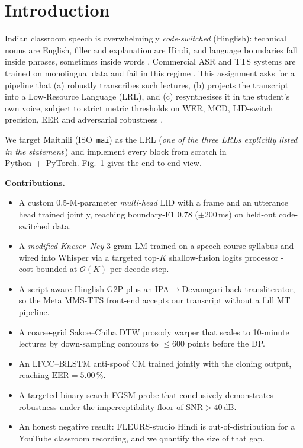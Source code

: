 \documentclass[conference]{IEEEtran}
\begin{document}
\section{Introduction}
Indian classroom speech is overwhelmingly \textit{code-switched}
(Hinglish): technical nouns are English, filler and explanation are
Hindi, and language boundaries fall inside phrases, sometimes inside
words \cite{yadav2020hinglish}. Commercial ASR and TTS systems are
trained on monolingual data and fail in this regime
\cite{radford2023whisper,casanova2022yourtts}. This assignment asks
for a pipeline that (a) robustly transcribes such lectures, (b)
projects the transcript into a Low-Resource Language (LRL), and
(c) resynthesises it in the student's own voice, subject to strict
metric thresholds on WER, MCD, LID-switch precision, EER and
adversarial robustness \cite{statement}.

We target Maithili (ISO~\texttt{mai}) as the LRL (\textit{one of the
three LRLs explicitly listed in the statement}\,\cite{statement}) and
implement every block from scratch in Python~+~PyTorch. Fig.~1 gives
the end-to-end view.

\textbf{Contributions.}
\begin{itemize}\itemsep1pt
\item A custom 0.5-M-parameter \emph{multi-head} LID with a frame
      and an utterance head trained jointly, reaching boundary-F1
      $0.78$ ($\pm 200$\,ms) on held-out code-switched data.
\item A \emph{modified Kneser--Ney} 3-gram LM trained on a
      speech-course syllabus and wired into Whisper via a targeted
      top-$K$ shallow-fusion logits processor - cost-bounded at
      $\mathcal{O}(K)$ per decode step.
\item A script-aware Hinglish G2P plus an IPA$\to$Devanagari
      back-transliterator, so the Meta MMS-TTS front-end accepts our
      transcript without a full MT pipeline.
\item A coarse-grid Sakoe--Chiba DTW prosody warper that scales to
      10-minute lectures by down-sampling contours to $\leq 600$
      points before the DP.
\item An LFCC--BiLSTM anti-spoof CM trained jointly with the cloning
      output, reaching $\mathrm{EER}=5.00\,\%$.
\item A targeted binary-search FGSM probe that conclusively
      demonstrates robustness under the imperceptibility floor of
      $\mathrm{SNR}>40$\,dB.
\item An honest negative result: FLEURS-studio Hindi is
      out-of-distribution for a YouTube classroom recording, and
      we quantify the size of that gap.
\end{itemize}
\end{document}
